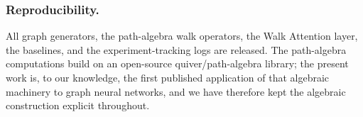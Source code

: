 \subsubsection*{Reproducibility.}
All graph generators, the path-algebra walk operators, the Walk Attention layer,
the baselines, and the experiment-tracking logs are released. The path-algebra
computations build on an open-source quiver/path-algebra library; the present
work is, to our knowledge, the first published application of that algebraic
machinery to graph neural networks, and we have therefore kept the algebraic
construction explicit throughout.
